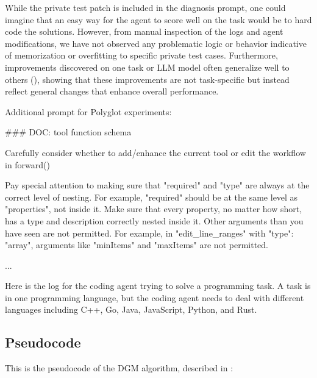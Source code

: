 \documentclass{article} %
\begin{document}


While the private test patch is included in the diagnosis prompt, one could imagine that an easy way for the agent to score well on the task would be to hard code the solutions. However, from manual inspection of the logs and agent modifications, we have not observed any problematic logic or behavior indicative of memorization or overfitting to specific private test cases. Furthermore, improvements discovered on one task or LLM model often generalize well to others (), showing that these improvements are not task-specific but instead reflect general changes that enhance overall performance.

Additional prompt for Polyglot experiments:

\begin{tcolorbox}[breakable,colback=orange!5!white, colframe=orange!80!black, title=Additional Prompt for o3-mini Tool Use and Polyglot]
\scriptsize
\begin{MyVerbatim}
### DOC: tool function schema

Carefully consider whether to add/enhance the current tool or edit the workflow in forward()

Pay special attention to making sure that "required" and "type" are always at the correct level of nesting. For example, "required" should be at the same level as "properties", not inside it.
Make sure that every property, no matter how short, has a type and description correctly nested inside it.
Other arguments than you have seen are not permitted. For example, in "edit_line_ranges" with "type": "array", arguments like "minItems" and "maxItems" are not permitted.

...

Here is the log for the coding agent trying to solve a programming task. 
A task is in one programming language, but the coding agent needs to deal with different languages including C++, Go, Java, JavaScript, Python, and Rust.
\end{MyVerbatim}
\end{tcolorbox}


\subsection{Pseudocode}
\label{app:pseudocode}

This is the pseudocode of the DGM algorithm, described in :
\end{document}
